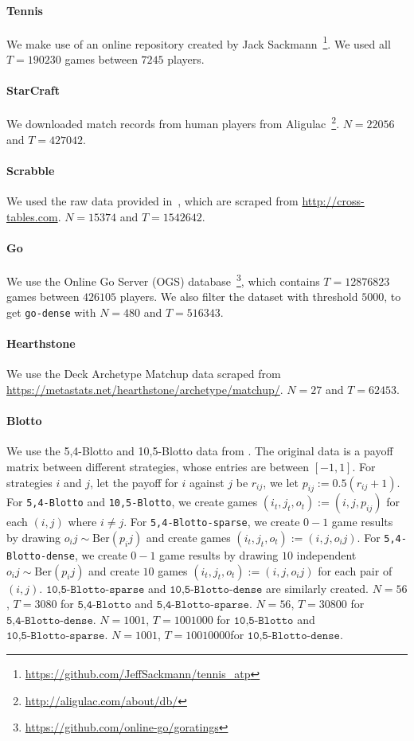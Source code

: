 \paragraph{Tennis} We make use of an online repository created by Jack Sackmann~\footnote{\url{https://github.com/JeffSackmann/tennis_atp}}. We used all $T=190230$ games between $7245$ players.
\paragraph{StarCraft} We downloaded match records from human players from Aligulac~\footnote{\url{http://aligulac.com/about/db/}}. $N=22056$ and $T=427042$.
\paragraph{Scrabble} We used the raw data provided in~\citet{fivethirtyeight}, which are scraped from \url{http://cross-tables.com}. $N=15374$ and $T=1542642$.
\paragraph{Go} We use the Online Go Server (OGS) database~\footnote{\url{https://github.com/online-go/goratings}}, which contains $T=12876823$ games between $426105$ players. We also filter the dataset with threshold $5000$, to get \texttt{go-dense} with $N=480$ and $T=516343$.
\paragraph{Hearthstone} We use the Deck Archetype Matchup data scraped from \url{https://metastats.net/hearthstone/archetype/matchup/}. $N=27$ and $T=62453$.
\paragraph{Blotto} We use the 5,4-Blotto and 10,5-Blotto data from \cite{czarnecki2020real}. The original data is a payoff matrix between different strategies, whose entries are between $[-1,1]$. For strategies $i$ and $j$, let the payoff for $i$ against $j$ be $r_{ij}$, we let $p_{ij}:=0.5 (r_{ij}+1)$. For \texttt{5,4-Blotto} and \texttt{10,5-Blotto}, we create games $(i_t,j_t,o_t) := (i,j,p_{ij})$ for each $(i,j)$ where $i \neq j$. For \texttt{5,4-Blotto-sparse}, we create $0-1$ game results by drawing $o_ij \sim \text{Ber} (p_ij)$ and create games $(i_t,j_t,o_t) := (i,j, o_ij)$. For \texttt{5,4-Blotto-dense}, we create $0-1$ game results by drawing $10$ independent $o_ij \sim \text{Ber} (p_ij)$ and create $10$ games $(i_t,j_t,o_t) := (i,j, o_ij)$ for each pair of $(i,j)$. $\texttt{10,5-Blotto-sparse}$ and $\texttt{10,5-Blotto-dense}$ are similarly created. $N=56$, $T=3080$ for $\texttt{5,4-Blotto}$ and $\texttt{5,4-Blotto-sparse}$. $N=56$, $T=30800$ for $\texttt{5,4-Blotto-dense}$.
$N=1001$, $T=1001000$ for $\texttt{10,5-Blotto}$ and $\texttt{10,5-Blotto-sparse}$. $N=1001$, $T=10010000$for $\texttt{10,5-Blotto-dense}$.

